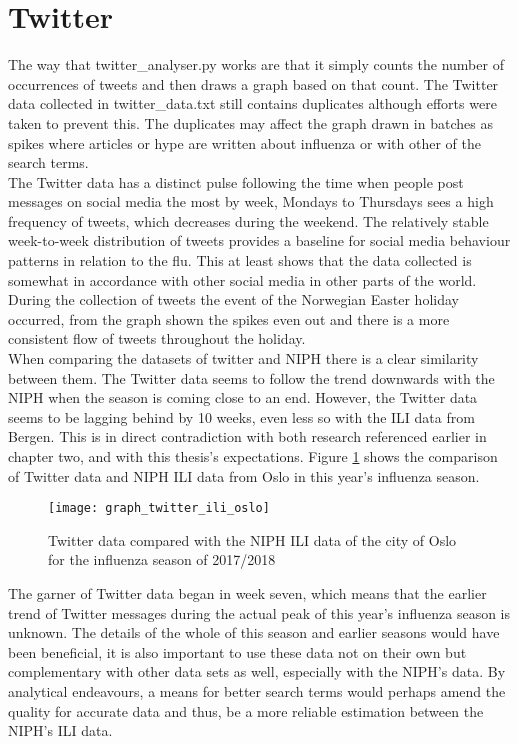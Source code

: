 \section{Twitter}
The way that twitter\_analyser.py works are that it simply counts the number of occurrences of tweets and then draws a graph based on that count. The Twitter data collected in twitter\_data.txt still contains duplicates although efforts were taken to prevent this. The duplicates may affect the graph drawn in batches as spikes where articles or hype are written about influenza or with other of the search terms.
\\
The Twitter data has a distinct pulse following the time when people post messages on social media the most by week\cite{socialTrend}, Mondays to Thursdays sees a high frequency of tweets, which decreases during the weekend. The relatively stable week-to-week distribution of tweets provides a baseline for social media behaviour patterns in relation to the flu. This at least shows that the data collected is somewhat in accordance with other social media in other parts of the world. During the collection of tweets the event of the Norwegian Easter holiday occurred, from the graph shown the spikes even out and there is a more consistent flow of tweets throughout the holiday.
\\
When comparing the datasets of twitter and NIPH there is a clear similarity between them. The Twitter data seems to follow the trend downwards with the NIPH when the season is coming close to an end. However, the Twitter data seems to be lagging behind by 10 weeks, even less so with the ILI data from Bergen. This is in direct contradiction with both research referenced earlier in chapter two, and with this thesis's expectations. Figure \ref{fig:graph_twitter_ili_oslo} shows the comparison of Twitter data and NIPH ILI data from Oslo in this year's influenza season.

\begin{figure}[!htb]
\texttt{[image: graph\_twitter\_ili\_oslo]}
\centering
\caption{Twitter data compared with the NIPH ILI data of the city of Oslo for the influenza season of 2017/2018}
\label{fig:graph_twitter_ili_oslo}
\end{figure}

The garner of Twitter data began in week seven, which means that the earlier trend of Twitter messages during the actual peak of this year's influenza season is unknown. The details of the whole of this season and earlier seasons would have been beneficial, it is also important to use these data not on their own but complementary with other data sets as well, especially with the NIPH's data. By analytical endeavours, a means for better search terms would perhaps amend the quality for accurate data and thus, be a more reliable estimation between the NIPH's ILI data.







